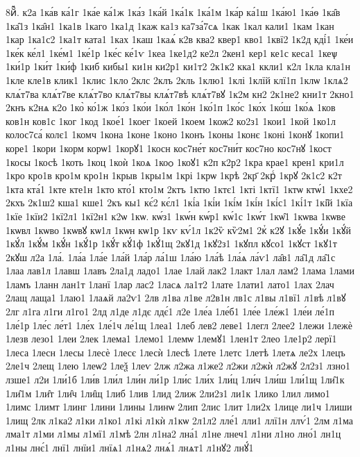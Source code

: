 {8й꙽҇.
к2а
1ка́в
ка́1г
1ка́е
ка́1ж
1ка́з
1ка́й
1ка́1к
1ка́1м
1ка́р
ка́1ш
1ка́ю1
1ка́ѳ
1ка̑в
1ка̑1з
1ка̑н1
1ка1в
1каго
1ка1д
1каж
ка1з
ка7за́7сѧ
1как
1кал
кали1
1кам
1кан
1кар
1ка1с2
1ка1т
ката1
1ках
1каш
1каѧ́
к2в
ква2
квер1
кво1
1квї2
1к2д
кді́1
1ке́и
1ке́к
ке́л1
1ке́м1
1ке́1р
1ке́с
ке́1ѵ
1кеа
1ке1д2
ке2л
2кен1
кер1
ке1с
кеса1
1кеѱ
1ки́1р
1ки́т
1ки́ф
1киб
кибы1
ки1н
ки2р1
ки1т2
2к1к2
кка1
ккли1
к2л
1кла
кла1н
1кле
кле1в
клик1
1клис
1кло
2клс
2клъ
2кль
1клю1
1клі
1клїй
клї1п
1клѡ
1клѧ2
клѧ́т7ва
клѧ́т7ве
клѧ́т7во
клѧ́т7вы
клѧ́т7вѣ
клѧ́т7вꙋ
1к2м
кн2
2к1не2
кни1т
2кно1
2кнъ
к2нѧ
к2о
1ко̀
ко́1ж
1ко́з
1ко́и
1ко́л
1ко́н
1ко́1п
1ко́с
1ко́х
1ко́ш
1ко́ѧ
1ков
ков1н
ков1с
1ког
1код
1кое́1
1коег
1коей
1коем
1кож2
ко2з1
1кои1
1кой
1ко1л
колос7са́
колє1
1комч
1кона
1коне
1коно
1конъ
1коны
1конє
1коні
1конꙋ
1копи1
коре1
1кори
1корм
корѡ1
1корꙋ1
1косн
кос7не́т
кос7ни́т
кос7но
кос7нꙋ
1кост
1косы
1косѣ
1коть
1коц
1коѝ
1коѧ
1коѻ
1коꙋ1
к2п
к2р2
1кра
крае1
крен1
кри1л
1кро
кро1в
кро1м
кро1н
1крыв
1кры1м
1крі
1крѡ
1крѣ
2кр҃
2крⷭ
1крꙋ
2к1с2
к2т
1кта
кта́1
1кте
кте1н
1кто
кто́1
кто1м
2ктъ
1ктю
1ктє1
1кті
1ктї1
1ктѡ
ктѡ́1
1кхе2
2кхъ
2к1ш2
кша1
кше1
2къ
кы1
кє́2
кє́л1
1кі́а
1кі́и
1кі́м
1кі́н
1кі́с1
1кі́1т
1кі̑й
1кїа
1кїе
1кїи2
1кї2л1
1кї2н1
к2ѡ
1кѡ.
кѡ́з1
1кѡ́н
кѡ́р1
кѡ́1с
1кѡ́т
1кѡ̑1
1кѡва
1кѡве
1кѡвл
1кѡво
1кѡвꙋ
кѡ1л
1кѡн
кѡ1р
1кѵ
кѵ́1л
1к2ѷ
кѷ2м1
2кⷮ
к2ꙋ
1кꙋ́е
1кꙋ́и
1кꙋ́й
1кꙋ́л
1кꙋ́м
1кꙋ́н
1кꙋ́1р
1кꙋ́т
кꙋ́1ф
1кꙋ́1щ
2кꙋ1д
1кꙋ2з1
1кꙋпл
кꙋсо1
1кꙋст
1кꙋ1т
2кꙋш
л2а
1ла́.
1ла́а
1ла́е
1ла́й
1ла́р
ла́1ш
1ла́ю
1ла́ѣ
1ла́ѧ
ла́ѵ1
ла̑в1
ла̑1д
ла̑1с
1лаа
лав1л
1лавш
1лавъ
2ла1д
ладо1
1лае
1лай
лак2
1лакт
1лал
лам2
1лама
1лами
1ламъ
1ланн
лан1т
1ланї
1лар
лас2
1ласѧ
ла1т2
1лате
1лати1
лато1
1лах
2лач
2лащ
лаща1
1лаю1
1лаѧй
ла2ѵ1
2лв
л1ва
л1ве
л2в1н
лв1с
л1вы
л1вї1
л1вѣ
л1вꙋ
2лг
л1га
л1ги
л1го1
2лд
л1де
л1дє
лдє́1
л2е
1ле́а
1ле́б1
1ле́е
1ле́ж1
1ле́и
ле́1п
1ле́1р
1ле́с
ле́т1
1ле́х
1ле́1ч
ле́1щ
1леа1
1леб
лев2
леве1
1легл
2лее2
1лежи
1лежѐ
1лезв
лезо1
1леи
2лек
1лема1
1лемо1
1лемѡ
1лемꙋ1
1лен1т
2лео
1ле1р2
лерї1
1леса
1лесн
1лесы
1лесѐ
1лесє
1лесѝ
1лесѣ
1лете
1летс
1летѣ
1летѧ
ле2х
1лецъ
2ле1ч
2лещ
1лею
1леѡ2
1леѯ
1леѵ
2лж
л2жа
л1же2
л2жи
л2жѝ
л2жꙋ
2л2з1
лзно1
лзше1
л2и
1ли́1б
1ли́в
1ли́л
1ли́н
ли́1р
1ли́с
1ли́х
1ли́ц
1ли́ч
1ли́ш
1ли́1щ
1ли̑1к
1ли̑1м
1ли̑т
1ли̑ч
1ли̑щ
1либ
1лив
1лид
2лиж
2ли2з1
ли1к
1лико
1лил
лимо1
1лимс
1лимт
1линг
1лини
1лины
1линѡ
2лип
2лис
1лит
1ли2х
1лице
ли1ч
1лиши
1лищ
2лк
л1ка2
л1ки
л1ко1
л1кі
л1кѝ
л1кѡ
2л1л2
лле́1
лли1
ллї1н
ллѵ́1
2лм
л1ма
лма1т
л1ми
л1мы
л1мї1
л1мѣ
2лн
л1на2
лна́1
л1не
лнеч1
л1ни
л1но
лно́1
лн1ц
л1ны
лнє́1
лнї1
лнїи1
лнїѧ1
л1нѧ2
лнѧ́1
лнѧт1
л1нꙋ2
лнꙋ́1
}
